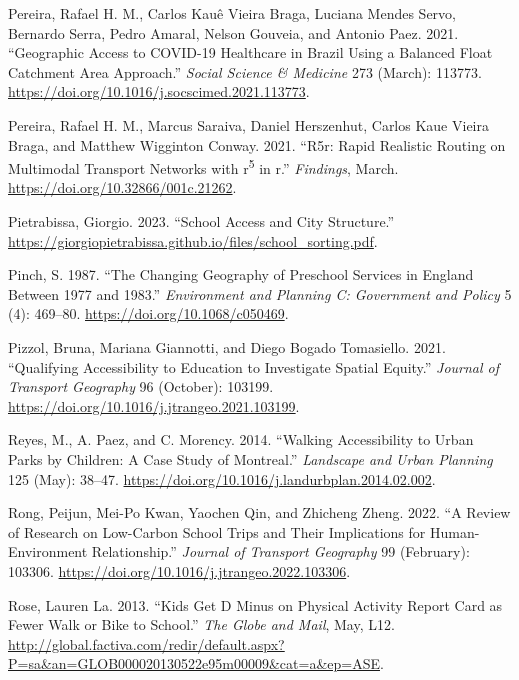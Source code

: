 \documentclass[
default
]{sn-jnl}
\newlength{\cslhangindent}
\newenvironment{CSLReferences}[2] %
 {\begin{list}{}{%
  \setlength{\itemindent}{0pt}
  \setlength{\leftmargin}{0pt}
  \setlength{\parsep}{0pt}
  \ifodd #1
   \setlength{\leftmargin}{\cslhangindent}
   \setlength{\itemindent}{-1\cslhangindent}
  \fi
  \setlength{\itemsep}{#2\baselineskip}}}
 {\end{list}}
\begin{document}
\begin{CSLReferences}{1}{0}
Pereira, Rafael H. M., Carlos Kauê Vieira Braga, Luciana Mendes Servo,
Bernardo Serra, Pedro Amaral, Nelson Gouveia, and Antonio Paez. 2021.
{``Geographic Access to {COVID}-19 Healthcare in Brazil Using a Balanced
Float Catchment Area Approach.''} \emph{Social Science \& Medicine} 273
(March): 113773. \url{https://doi.org/10.1016/j.socscimed.2021.113773}.

Pereira, Rafael H. M., Marcus Saraiva, Daniel Herszenhut, Carlos Kaue
Vieira Braga, and Matthew Wigginton Conway. 2021. {``R5r: Rapid
Realistic Routing on Multimodal Transport Networks with
r\textsuperscript{5} in r.''} \emph{Findings}, March.
\url{https://doi.org/10.32866/001c.21262}.

Pietrabissa, Giorgio. 2023. {``School Access and City Structure.''}
\url{https://giorgiopietrabissa.github.io/files/school_sorting.pdf}.

Pinch, S. 1987. {``The Changing Geography of Preschool Services in
England Between 1977 and 1983.''} \emph{Environment and Planning C:
Government and Policy} 5 (4): 469--80.
\url{https://doi.org/10.1068/c050469}.

Pizzol, Bruna, Mariana Giannotti, and Diego Bogado Tomasiello. 2021.
{``Qualifying Accessibility to Education to Investigate Spatial
Equity.''} \emph{Journal of Transport Geography} 96 (October): 103199.
\url{https://doi.org/10.1016/j.jtrangeo.2021.103199}.

Reyes, M., A. Paez, and C. Morency. 2014. {``Walking Accessibility to
Urban Parks by Children: {A} Case Study of {Montreal}.''}
\emph{Landscape and Urban Planning} 125 (May): 38--47.
\url{https://doi.org/10.1016/j.landurbplan.2014.02.002}.

Rong, Peijun, Mei-Po Kwan, Yaochen Qin, and Zhicheng Zheng. 2022. {``A
Review of Research on Low-Carbon School Trips and Their Implications for
Human-Environment Relationship.''} \emph{Journal of Transport Geography}
99 (February): 103306.
\url{https://doi.org/10.1016/j.jtrangeo.2022.103306}.

Rose, Lauren La. 2013. {``Kids Get {D} Minus on Physical Activity Report
Card as Fewer Walk or Bike to School.''} \emph{The Globe and Mail}, May,
L12.
\url{http://global.factiva.com/redir/default.aspx?P=sa&an=GLOB000020130522e95m00009&cat=a&ep=ASE}.


\end{CSLReferences}
\end{document}
